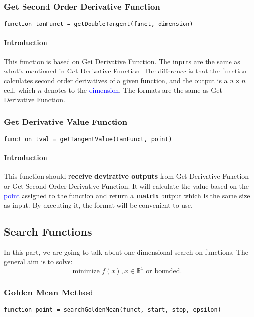 \documentclass{article}
\begin{document}
\subsubsection{Get Second Order Derivative Function}
\begin{verbatim}
function tanFunct = getDoubleTangent(funct, dimension)
\end{verbatim}

\paragraph{Introduction}
This function is based on Get Derivative Function. The inputs are the same as what's mentioned in Get Derivative Function. The difference is that the function calculates second order derivatives of a given function, and the output is a $n \times n$ cell, which $n$ denotes to the \textcolor{blue}{dimension}. The formats are the same as Get Derivative Function.

\subsubsection{Get Derivative Value Function}
\begin{verbatim}
function tval = getTangentValue(tanFunct, point)
\end{verbatim}

\paragraph{Introduction}
This function should \textbf{receive devirative outputs} from Get Derivative Function or Get Second Order Derivative Function. It will calculate the value based on the \textcolor{blue}{point} assigned to the function and return a \textbf{matrix} output which is the same size as input. By executing it, the format will be convenient to use.

\subsection{Search Functions}
In this part, we are going to talk about one dimensional search on functions. The general aim is to solve:
\begin{equation*}
    \mbox{minimize } f(x), x \in \mathbb{R}^1 \mbox{ or bounded.}
\end{equation*}

\subsubsection{Golden Mean Method}
\begin{verbatim}
function point = searchGoldenMean(funct, start, stop, epsilon)
\end{verbatim}
\end{document}
